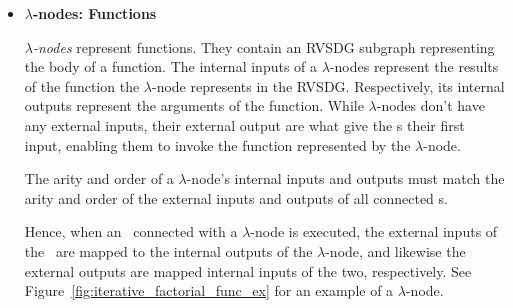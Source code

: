 \begin{itemize}
\item \textbf{$\lambda$-nodes: Functions}

\textit{$\lambda$-nodes} represent functions. They contain an RVSDG subgraph
representing the body of a function. The internal inputs of a $\lambda$-nodes
represent the results of the function the $\lambda$-node represents in the
RVSDG. Respectively, its internal outputs represent the arguments of the
function. While $\lambda$-nodes don't have any external inputs, their external
output are what give the \applyNode s their first input, enabling them to invoke
the function represented by the $\lambda$-node.

The arity and order of a $\lambda$-node's internal inputs and outputs must match
the arity and order of the external inputs and outputs of all connected
\applyNode s.

Hence, when an \applyNode~connected with a $\lambda$-node is executed, the
external inputs of the \applyNode~are mapped to the internal outputs of the
$\lambda$-node, and likewise the external outputs are mapped internal inputs of
the two, respectively. See Figure~\ref{fig:iterative_factorial_func_ex} for an
example of a $\lambda$-node.


\end{itemize}
